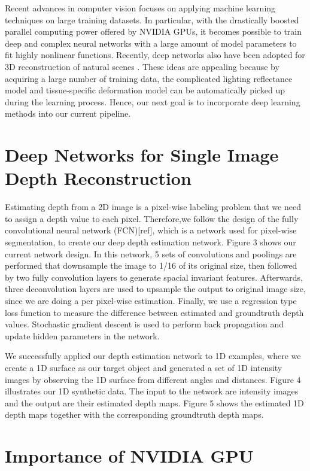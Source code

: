 \documentclass{llncs}
\begin{document}
Recent advances in computer vision focuses on applying machine learning techniques on large training datasets. In particular, with the drastically boosted parallel computing power offered by NVIDIA GPUs, it becomes possible to train deep and complex neural networks with a large amount of model parameters to fit highly nonlinear functions. Recently, deep networks also have been adopted for 3D reconstruction of natural scenes \cite{liu2015,rematas2016}. These ideas are appealing because by acquiring a large number of training data, the complicated lighting reflectance model and tissue-specific deformation model can be automatically picked up during the learning process. Hence, our next goal is to incorporate deep learning methods into our current pipeline.

\section{Deep Networks for Single Image Depth Reconstruction}

Estimating depth from a 2D image is a pixel-wise labeling problem that we need to assign a depth value to each pixel. Therefore,we follow the design of the fully convolutional neural network (FCN)[ref], which is a network used for pixel-wise segmentation, to create our deep depth estimation network. Figure 3 shows our current network design. In this network, 5 sets of convolutions and poolings are performed that downsample the image to 1/16 of its original size, then followed by two fully convolution layers to generate spacial invariant features. Afterwards, three deconvolution layers are used to upsample the output to original image size, since we are doing a per pixel-wise estimation. Finally, we use a regression type loss function to measure the difference between estimated and groundtruth depth values. Stochastic gradient descent is used to perform back propagation and update hidden parameters in the network. 

We successfully applied our depth estimation network to 1D examples, where we create a 1D surface as our target object and generated a set of 1D intensity images by observing the 1D surface  from different angles and distances. Figure 4 illustrates our 1D synthetic data. The input to the network are intensity images and the output are their estimated depth maps. Figure 5 shows the estimated 1D depth maps together with the corresponding groundtruth depth maps.

\section{Importance of NVIDIA GPU}
\end{document}

